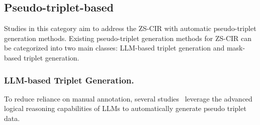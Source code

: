 \subsection{Pseudo-triplet-based}
Studies in this category aim to address the ZS-CIR with automatic pseudo-triplet generation methods. 
Existing pseudo-triplet generation methods for ZS-CIR can be categorized into two main classes: LLM-based triplet generation and mask-based triplet generation. 

\subsubsection{LLM-based Triplet Generation.} 
To reduce reliance on manual annotation, several studies~\cite{transagg, hycir, zhang2024magiclens, compodiff, mcl, rtd, pvlf} leverage the advanced logical reasoning capabilities of  LLMs to automatically generate pseudo triplet data. 

